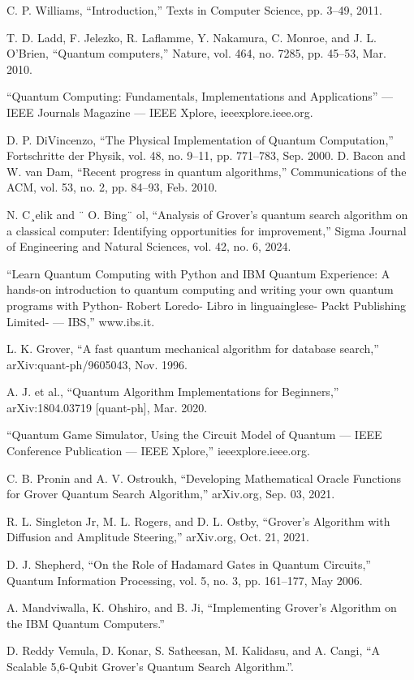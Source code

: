 \documentclass[conference]{IEEEtran}
\begin{document}
\begin{thebibliography}{00}

	  C. P. Williams, “Introduction,” Texts in Computer Science, pp. 3–49,
	2011.

	  T. D. Ladd, F. Jelezko, R. Laflamme, Y. Nakamura, C. Monroe, and
	J. L. O’Brien, “Quantum computers,” Nature, vol. 464, no. 7285, pp.
	45–53, Mar. 2010.

	 “Quantum Computing: Fundamentals, Implementations and Applications” — IEEE Journals Magazine — IEEE Xplore, ieeexplore.ieee.org.

	 D. P. DiVincenzo, “The Physical Implementation of Quantum Computation,” Fortschritte der Physik, vol. 48, no. 9–11, pp. 771–783, Sep.
	2000.
	  D. Bacon and W. van Dam, “Recent progress in quantum algorithms,”
	Communications of the ACM, vol. 53, no. 2, pp. 84–93, Feb. 2010.

	  N. C¸elik and ¨ O. Bing¨ ol, “Analysis of Grover’s quantum search algorithm
	on a classical computer: Identifying opportunities for improvement,”
	Sigma Journal of Engineering and Natural Sciences, vol. 42, no. 6, 2024.

	 “Learn Quantum Computing with Python and IBM Quantum Experience: A hands-on introduction to quantum computing and writing your own quantum programs with Python- Robert Loredo- Libro in linguainglese- Packt Publishing Limited- — IBS,” www.ibs.it.

	  L. K. Grover, “A fast quantum mechanical algorithm for database search,” arXiv:quant-ph/9605043, Nov. 1996.

	 A. J. et al., “Quantum Algorithm Implementations for Beginners,” arXiv:1804.03719 [quant-ph], Mar. 2020.

	  “Quantum Game Simulator, Using the Circuit Model of Quantum — IEEE Conference Publication — IEEE Xplore,” ieeexplore.ieee.org.

	  C. B. Pronin and A. V. Ostroukh, “Developing Mathematical Oracle
	Functions for Grover Quantum Search Algorithm,” arXiv.org, Sep. 03,
	2021.

	 R. L. Singleton Jr, M. L. Rogers, and D. L. Ostby, “Grover’s Algorithm
	with Diffusion and Amplitude Steering,” arXiv.org, Oct. 21, 2021.

	  D. J. Shepherd, “On the Role of Hadamard Gates in Quantum Circuits,”
	Quantum Information Processing, vol. 5, no. 3, pp. 161–177, May 2006.

	 A. Mandviwalla, K. Ohshiro, and B. Ji, “Implementing Grover’s Algorithm on the IBM Quantum Computers.”

	  D. Reddy Vemula, D. Konar, S. Satheesan, M. Kalidasu, and A. Cangi,
	“A Scalable 5,6-Qubit Grover’s Quantum Search Algorithm.”.
\end{thebibliography}
\end{document}
